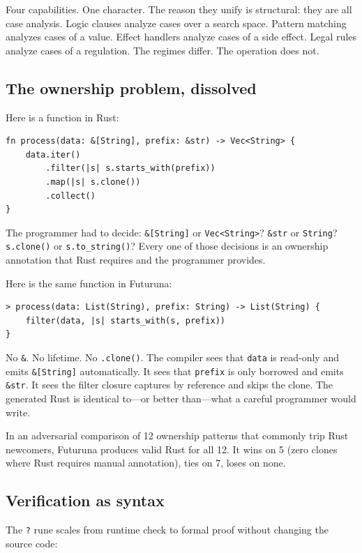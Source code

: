 \documentclass[11pt,a4paper]{article}
\begin{document}
Four capabilities. One character. The reason they unify is structural: they are all case analysis. Logic clauses analyze cases over a search space. Pattern matching analyzes cases of a value. Effect handlers analyze cases of a side effect. Legal rules analyze cases of a regulation. The regimes differ. The operation does not.

\subsection{The ownership problem, dissolved}

Here is a function in Rust:

\begin{lstlisting}[language=rustlang]
fn process(data: &[String], prefix: &str) -> Vec<String> {
    data.iter()
        .filter(|s| s.starts_with(prefix))
        .map(|s| s.clone())
        .collect()
}
\end{lstlisting}

The programmer had to decide: \texttt{\&[String]} or \texttt{Vec<String>}? \texttt{\&str} or \texttt{String}? \texttt{s.clone()} or \texttt{s.to\_string()}? Every one of those decisions is an ownership annotation that Rust requires and the programmer provides.

Here is the same function in Futuruna:

\begin{lstlisting}
> process(data: List(String), prefix: String) -> List(String) {
    filter(data, |s| starts_with(s, prefix))
}
\end{lstlisting}

No \texttt{\&}. No lifetime. No \texttt{.clone()}. The compiler sees that \texttt{data} is read-only and emits \texttt{\&[String]} automatically. It sees that \texttt{prefix} is only borrowed and emits \texttt{\&str}. It sees the filter closure captures by reference and skips the clone. The generated Rust is identical to---or better than---what a careful programmer would write.

In an adversarial comparison of 12 ownership patterns that commonly trip Rust newcomers, Futuruna produces valid Rust for all 12. It wins on 5 (zero clones where Rust requires manual annotation), ties on 7, loses on none.

\subsection{Verification as syntax}

The \texttt{?} rune scales from runtime check to formal proof without changing the source code:
\end{document}

